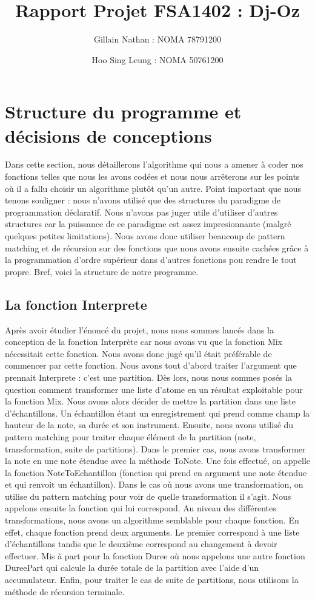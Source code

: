\documentclass[a4paper,12pt]{article}
\title{Rapport Projet FSA1402 : Dj-Oz}
\author{Gillain Nathan : NOMA 78791200 \and Hoo Sing Leung : NOMA 50761200}
\begin{document}
\maketitle
\tableofcontents


\section{Structure du programme et décisions de conceptions}

Dans cette section, nous détaillerons l'algorithme qui nous a amener à coder nos fonctions telles que nous les avons codées et
nous nous arrêterons sur les points où il a fallu choisir un algorithme plutôt qu'un autre. Point important que nous tenons 
souligner : nous n'avons utilisé que des structures du paradigme de programmation déclaratif. Nous n'avons pas juger utile
d'utiliser d'autres structures car la puissance de ce paradigme est assez impresionnante (malgré quelques petites limitations).
Nous avons donc utiliser beaucoup de pattern matching et de récursion sur des fonctions que nous avons ensuite cachées grâce
à la programmation d'ordre supérieur dans d'autres fonctions pou rendre le tout propre. Bref, voici la structure de notre programme.

\subsection{La fonction Interprete}

Après avoir étudier l'énoncé du projet, nous nous sommes lancés dans la conception de la fonction Interprète car nous avons vu
que la fonction Mix nécessitait cette fonction. Nous avons donc jugé qu'il était préférable de commencer par cette fonction.
Nous avons tout d'abord traiter l'argument que prennait Interprete : c'est une partition. Dès lors, nous nous sommes posés la 
question comment transformer une liste d'atome en un résultat exploitable pour la fonction Mix. Nous avons alors décider 
de mettre la partition dans une liste d'échantillons. Un échantillon étant un enregistrement qui prend comme champ la hauteur
de la note, sa durée et son instrument. Ensuite, nous avons utilisé du pattern matching pour traiter chaque élément de la 
partition (note, transformation, suite de partitions). 
Dans le premier cas, nous avons transformer la note en une note étendue avec la méthode ToNote. Une fois effectué, on appelle 
la fonction NoteToEchantillon (fonction qui prend en argument une note étendue et qui renvoit un échantillon).
Dans le cas où nous avons une transformation, on utilise du pattern matching pour voir de quelle transformation il s'agit. 
Nous appelons ensuite la fonction qui lui correspond. Au niveau des différentes transformations, nous avons un algorithme 
semblable pour chaque fonction. En effet, chaque fonction prend deux arguments. Le premier correspond à une liste 
d'échantillons tandis que le deuxième correspond au changement à devoir effectuer. Mis à part pour la fonction Duree où nous 
appelons une autre fonction DureePart qui calcule la durée totale de la partition avec l'aide d'un accumulateur.
Enfin, pour traiter le cas de suite de partitions, nous utilisons la méthode de récursion terminale.
\end{document}
